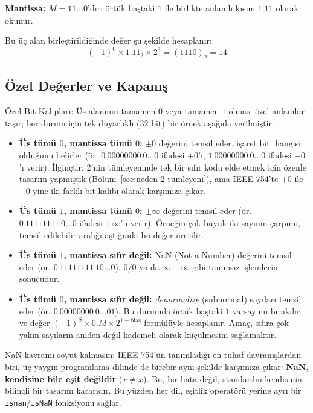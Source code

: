 \noindent\textbf{Mantissa:} $M=11\ldots0$'dır; örtük baştaki $1$ ile birlikte anlamlı
kısım $1.11$ olarak okunur.

\noindent Bu üç alan birleştirildiğinde değer şu şekilde hesaplanır:
\[
(-1)^0\times1.11_2\times2^3 = (1110)_2 = 14
\]

\subsection{Özel Değerler ve Kapanış}
\label{sec:ieee754-ozel}

\begin{tanim}{Özel Bit Kalıpları:}
Üs alanının tamamen $0$ veya tamamen $1$ olması özel anlamlar taşır; her durum için tek
duyarlıklı ($32$ bit) bir örnek aşağıda verilmiştir.
\begin{itemize}[nosep, leftmargin=*]
    \item \textbf{Üs tümü $0$, mantissa tümü $0$:} $\pm0$ değerini temsil eder, işaret biti
    hangisi olduğunu belirler (ör. $0\ 00000000\ 0\ldots0$ ifadesi $+0$'ı,
    $1\ 00000000\ 0\ldots0$ ifadesi $-0$'ı verir). İlginçtir: 2'nin tümleyeninde tek bir
    sıfır kodu elde etmek için özenle tasarım yapmıştık (Bölüm~\ref{sec:neden-2-tumleyeni}),
    ama IEEE 754'te $+0$ ile $-0$ yine iki farklı bit kalıbı olarak karşımıza çıkar.
    \item \textbf{Üs tümü $1$, mantissa tümü $0$:} $\pm\infty$ değerini temsil eder (ör.
    $0\ 11111111\ 0\ldots0$ ifadesi $+\infty$'u verir). Örneğin çok büyük iki sayının
    çarpımı, temsil edilebilir aralığı aştığında bu değer üretilir.
    \item \textbf{Üs tümü $1$, mantissa sıfır değil:} NaN (Not a Number) değerini temsil
    eder (ör. $0\ 11111111\ 10\ldots0$), $0/0$ ya da $\infty-\infty$ gibi tanımsız
    işlemlerin sonucudur.
    \item \textbf{Üs tümü $0$, mantissa sıfır değil:} \emph{denormalize} (subnormal) sayıları
    temsil eder (ör. $0\ 00000000\ 0\ldots01$). Bu durumda örtük baştaki $1$ varsayımı
    bırakılır ve değer $(-1)^S\times0.M\times2^{1-\text{bias}}$ formülüyle hesaplanır.
    Amaç, sıfıra çok yakın sayıların aniden değil kademeli olarak küçülmesini sağlamaktır.
\end{itemize}
\end{tanim}

NaN kavramı soyut kalmasın; IEEE 754'ün tanımladığı en tuhaf davranışlardan biri, üç yaygın
programlama dilinde de birebir aynı şekilde karşımıza çıkar: \textbf{NaN, kendisine bile eşit
değildir} ($x \neq x$). Bu, bir hata değil, standardın kendisinin bilinçli bir tasarım
kararıdır. Bu yüzden her dil, eşitlik operatörü yerine ayrı bir \texttt{isnan}/\texttt{isNaN}
fonksiyonu sağlar.

